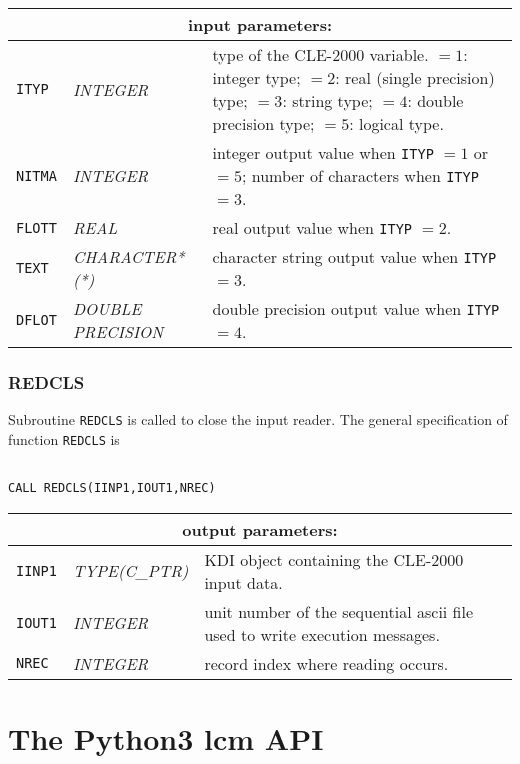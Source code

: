 \noindent
\begin{tabular}{|p{1.5cm}|p{3cm}|p{10cm}|}
\hline
\multicolumn{3}{|c|}{\bf input parameters:} \\
\hline
{\tt ITYP} & {\it INTEGER} & type of the CLE-2000 variable. $=1$: integer type;
$=2$: real (single precision) type;
$=3$: string type;
$=4$: double precision type;
$=5$: logical type.\\
\hline
{\tt NITMA} & {\it INTEGER} & integer output value when {\tt ITYP} $= 1$ or $= 5$;  number of characters when {\tt ITYP} $= 3$. \\
\hline
{\tt FLOTT} & {\it REAL} &  real output value when {\tt ITYP} $= 2$. \\
\hline
{\tt TEXT} & {\it CHARACTER*(*)} & character string output value when {\tt ITYP} $= 3$.  \\
\hline
{\tt DFLOT} & {\it DOUBLE PRECISION} & double precision output value when {\tt ITYP} $= 4$.  \\
\hline
\end{tabular}

\subsubsection{REDCLS}

Subroutine {\tt REDCLS} is called to close the input reader.
The general specification of function {\tt REDCLS} is

\begin{verbatim}

CALL REDCLS(IINP1,IOUT1,NREC)
\end{verbatim}

\vskip 0.8cm

\noindent
\begin{tabular}{|p{1.5cm}|p{2.5cm}|p{10.5cm}|}
\hline
\multicolumn{3}{|c|}{\bf output parameters:} \\
\hline
{\tt IINP1} & {\it TYPE(C\_PTR)} & KDI object containing the CLE-2000 input data.\\
\hline
{\tt IOUT1} & {\it INTEGER} & unit number of the sequential {\sc ascii} file used to write execution messages. \\
\hline
{\tt NREC} & {\it INTEGER} & record index where reading occurs. \\
\hline
\end{tabular}

\section{The Python3 {\sc lcm} API}

